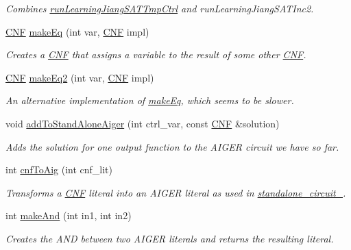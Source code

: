 \begin{DoxyCompactItemize}
\begin{DoxyCompactList}\small\item\em Combines \hyperlink{classLearningImplExtractor_ad41484b6bb6da18e50d31830a18e63e9}{run\-Learning\-Jiang\-S\-A\-T\-Tmp\-Ctrl} and run\-Learning\-Jiang\-S\-A\-T\-Inc2. \end{DoxyCompactList}\item 
\hyperlink{classCNF}{C\-N\-F} \hyperlink{classLearningImplExtractor_af747a4869a3ca8a8e77e39c435b94ce8}{make\-Eq} (int var, \hyperlink{classCNF}{C\-N\-F} impl)
\begin{DoxyCompactList}\small\item\em Creates a \hyperlink{classCNF}{C\-N\-F} that assigns a variable to the result of some other \hyperlink{classCNF}{C\-N\-F}. \end{DoxyCompactList}\item 
\hyperlink{classCNF}{C\-N\-F} \hyperlink{classLearningImplExtractor_ae491299fffa2b1dcb6ccce010b0fc5f7}{make\-Eq2} (int var, \hyperlink{classCNF}{C\-N\-F} impl)
\begin{DoxyCompactList}\small\item\em An alternative implementation of \hyperlink{classLearningImplExtractor_af747a4869a3ca8a8e77e39c435b94ce8}{make\-Eq}, which seems to be slower. \end{DoxyCompactList}\item 
void \hyperlink{classLearningImplExtractor_a70515dea9636bbcd9fe3e31bdf47e110}{add\-To\-Stand\-Alone\-Aiger} (int ctrl\-\_\-var, const \hyperlink{classCNF}{C\-N\-F} \&solution)
\begin{DoxyCompactList}\small\item\em Adds the solution for one output function to the A\-I\-G\-E\-R circuit we have so far. \end{DoxyCompactList}\item 
int \hyperlink{classLearningImplExtractor_a88143aa67de5be8848f643cfb2947834}{cnf\-To\-Aig} (int cnf\-\_\-lit)
\begin{DoxyCompactList}\small\item\em Transforms a \hyperlink{classCNF}{C\-N\-F} literal into an A\-I\-G\-E\-R literal as used in \hyperlink{classLearningImplExtractor_a17f7c47bf3e84fa5a70930e01a18deb2}{standalone\-\_\-circuit\-\_\-}. \end{DoxyCompactList}\item 
int \hyperlink{classLearningImplExtractor_a8f9d325813c0f792321a932f358cfe78}{make\-And} (int in1, int in2)
\begin{DoxyCompactList}\small\item\em Creates the A\-N\-D between two A\-I\-G\-E\-R literals and returns the resulting literal. \end{DoxyCompactList}\item 

\end{DoxyCompactItemize}
